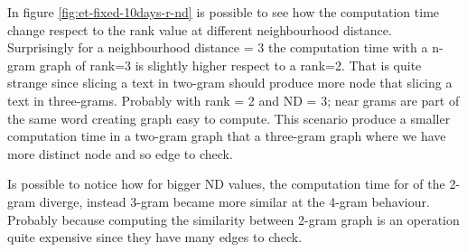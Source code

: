 In figure \ref{fig:et-fixed-10days-r-nd} is possible to see how the computation time change respect to the rank value at different neighbourhood distance. 
Surprisingly for a neighbourhood distance = 3 the computation time with a n-gram graph of rank=3 is slightly higher respect to a rank=2. 
That is quite strange since slicing a text in two-gram should produce more node that slicing a text in three-grams.
Probably with rank = 2 and ND = 3; near grams are part of the same word creating graph easy to compute.
This scenario produce a smaller computation time in a two-gram graph that a three-gram graph where we have more distinct node and so edge to check.

Is possible to notice how for bigger ND values, the computation time for of the 2-gram diverge, instead 3-gram became more similar at the 4-gram behaviour. Probably because computing the similarity between 2-gram graph is an operation quite expensive since they have many edges to check.

